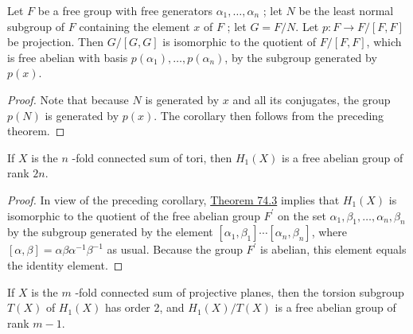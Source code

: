 \begin{corollary}
\label{cor:\thetheorem}
	Let \(F\) be a free group with free generators \({\alpha }_{1},\ldots ,{\alpha }_{n}\) ; let \(N\) be the least normal subgroup of \(F\) containing the element \(x\) of \(F\) ; let \(G = F/N\). Let \(p : F \rightarrow F/[ {F,F}]\) be projection. Then \(G/[ {G,G}]\) is isomorphic to the quotient of \(F/[ {F,F}]\), which is free abelian with basis \(p( {\alpha }_{1}),\ldots, p( {\alpha }_{n})\), by the subgroup generated by \(p(x)\).
\end{corollary}

\begin{proof}
	Note that because \(N\) is generated by \(x\) and all its conjugates, the group \(p( N)\) is generated by \(p(x)\). The corollary then follows from the preceding theorem.
\end{proof}
\begin{theorem}
\label{thm:\thetheorem}
	If \(X\) is the \(n\) -fold connected sum of tori, then \(H_{1}( X)\) is a free abelian group of rank \({2n}\).
\end{theorem}

\begin{proof}
	In view of the preceding corollary, \hyperref[thm:74.3]{Theorem 74.3} implies that \(H_{1}( X)\) is isomorphic to the quotient of the free abelian group \(F^{\prime }\) on the set \({\alpha }_{1},{\beta }_{1},\ldots ,{\alpha }_{n},{\beta }_{n}\) by the subgroup generated by the element \([ {{\alpha }_{1},{\beta }_{1}}] \cdots [ {{\alpha }_{n},{\beta }_{n}}]\), where \([ {\alpha ,\beta }] = {\alpha \beta }{\alpha }^{-1}{\beta }^{-1}\) as usual. Because the group \(F^{\prime }\) is abelian, this element equals the identity element.
\end{proof}
\begin{theorem}
\label{thm:\thetheorem}
	If \(X\) is the \(m\) -fold connected sum of projective planes, then the torsion subgroup \(T( X)\) of \(H_{1}( X)\) has order 2, and \(H_{1}( X) /T( X)\) is a free abelian group of rank \(m - 1\).
\end{theorem}

